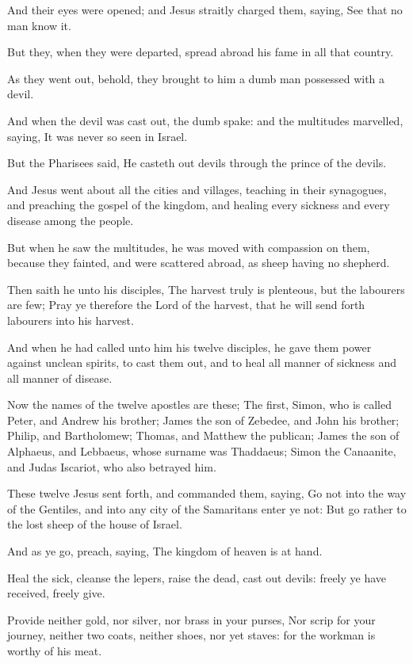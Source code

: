 \Verse And their eyes were opened; and Jesus straitly charged them, saying, See that no man know it.

\Verse But they, when they were departed, spread abroad his fame in all that country.

\Verse As they went out, behold, they brought to him a dumb man possessed with a devil.

\Verse And when the devil was cast out, the dumb spake: and the multitudes marvelled, saying, It was never so seen in Israel.

\Verse But the Pharisees said, He casteth out devils through the prince of the devils.

\Verse And Jesus went about all the cities and villages, teaching in their synagogues, and preaching the gospel of the kingdom, and healing every sickness and every disease among the people.

\Verse But when he saw the multitudes, he was moved with compassion on them, because they fainted, and were scattered abroad, as sheep having no shepherd.

\Verse Then saith he unto his disciples, The harvest truly is plenteous, but the labourers are few; \Verse Pray ye therefore the Lord of the harvest, that he will send forth labourers into his harvest.


\Chapter
\Verse And when he had called unto him his twelve disciples, he gave them power against unclean spirits, to cast them out, and to heal all manner of sickness and all manner of disease.

\Verse Now the names of the twelve apostles are these; The first, Simon, who is called Peter, and Andrew his brother; James the son of Zebedee, and John his brother; \Verse Philip, and Bartholomew; Thomas, and Matthew the publican; James the son of Alphaeus, and Lebbaeus, whose surname was Thaddaeus; \Verse Simon the Canaanite, and Judas Iscariot, who also betrayed him.

\Verse These twelve Jesus sent forth, and commanded them, saying, Go not into the way of the Gentiles, and into any city of the Samaritans enter ye not: \Verse But go rather to the lost sheep of the house of Israel.

\Verse And as ye go, preach, saying, The kingdom of heaven is at hand.

\Verse Heal the sick, cleanse the lepers, raise the dead, cast out devils: freely ye have received, freely give.

\Verse Provide neither gold, nor silver, nor brass in your purses, \Verse Nor scrip for your journey, neither two coats, neither shoes, nor yet staves: for the workman is worthy of his meat.

